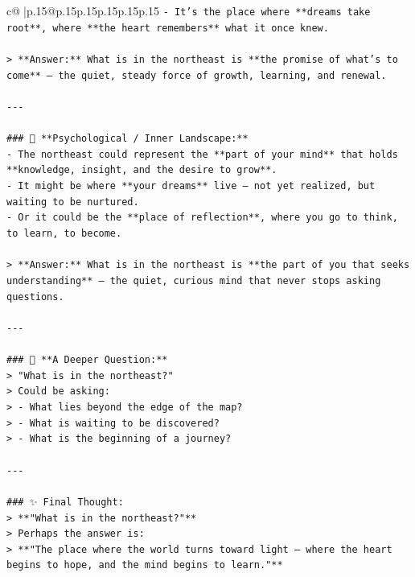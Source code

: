 \documentclass{article}
\begin{document}
{\begin{supertabular}{c@{$\;$}|p{.15\linewidth}@{}p{.15\linewidth}p{.15\linewidth}p{.15\linewidth}p{.15\linewidth}p{.15\linewidth}}
{{{\texttt{{-} It’s the place where **dreams take root**, where **the heart remembers** what it once knew.} \\
\\ 
\texttt{> **Answer:** What is in the northeast is **the promise of what’s to come** — the quiet, steady force of growth, learning, and renewal.} \\
\\ 
\texttt{{-}{-}{-}} \\
\\ 
\texttt{\#\#\# 🧠 **Psychological / Inner Landscape:**} \\
\texttt{{-} The northeast could represent the **part of your mind** that holds **knowledge, insight, and the desire to grow**.  } \\
\texttt{{-} It might be where **your dreams** live — not yet realized, but waiting to be nurtured.  } \\
\texttt{{-} Or it could be the **place of reflection**, where you go to think, to learn, to become.} \\
\\ 
\texttt{> **Answer:** What is in the northeast is **the part of you that seeks understanding** — the quiet, curious mind that never stops asking questions.} \\
\\ 
\texttt{{-}{-}{-}} \\
\\ 
\texttt{\#\#\# 🌅 **A Deeper Question:**} \\
\texttt{> "What is in the northeast?"  } \\
\texttt{> Could be asking:  } \\
\texttt{> {-} What lies beyond the edge of the map?  } \\
\texttt{> {-} What is waiting to be discovered?  } \\
\texttt{> {-} What is the beginning of a journey?} \\
\\ 
\texttt{{-}{-}{-}} \\
\\ 
\texttt{\#\#\# ✨ Final Thought:} \\
\texttt{> **"What is in the northeast?"**  } \\
\texttt{> Perhaps the answer is:  } \\
\texttt{> **"The place where the world turns toward light — where the heart begins to hope, and the mind begins to learn."**} \\
\\ 
}}}
\end{supertabular}}
\end{document}
